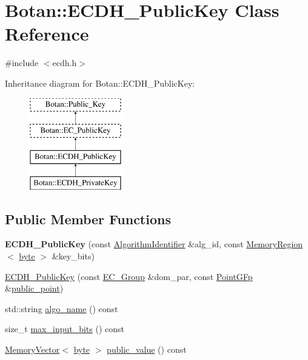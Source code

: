 \hypertarget{classBotan_1_1ECDH__PublicKey}{\section{Botan\-:\-:E\-C\-D\-H\-\_\-\-Public\-Key Class Reference}
\label{classBotan_1_1ECDH__PublicKey}
}


{\ttfamily \#include $<$ecdh.\-h$>$}

Inheritance diagram for Botan\-:\-:E\-C\-D\-H\-\_\-\-Public\-Key\-:\begin{figure}[H]
\begin{center}
\leavevmode
\includegraphics[height=4.000000cm]{classBotan_1_1ECDH__PublicKey}
\end{center}
\end{figure}
\subsection*{Public Member Functions}
\begin{DoxyCompactItemize}
\item 
\hypertarget{classBotan_1_1ECDH__PublicKey_abd3b5cafdcd7b0b8b1e7cae2e6568f00}{{\bfseries E\-C\-D\-H\-\_\-\-Public\-Key} (const \hyperlink{classBotan_1_1AlgorithmIdentifier}{Algorithm\-Identifier} \&alg\-\_\-id, const \hyperlink{classBotan_1_1MemoryRegion}{Memory\-Region}$<$ \hyperlink{namespaceBotan_a7d793989d801281df48c6b19616b8b84}{byte} $>$ \&key\-\_\-bits)}\label{classBotan_1_1ECDH__PublicKey_abd3b5cafdcd7b0b8b1e7cae2e6568f00}

\item 
\hyperlink{classBotan_1_1ECDH__PublicKey_a281af12551e9667105f14041c74142f6}{E\-C\-D\-H\-\_\-\-Public\-Key} (const \hyperlink{classBotan_1_1EC__Group}{E\-C\-\_\-\-Group} \&dom\-\_\-par, const \hyperlink{classBotan_1_1PointGFp}{Point\-G\-Fp} \&\hyperlink{classBotan_1_1EC__PublicKey_aaa811accdc280b77c1904bbbd819a1f7}{public\-\_\-point})
\item 
std\-::string \hyperlink{classBotan_1_1ECDH__PublicKey_a82eb094aea9609a05ab7e0fbf09857c2}{algo\-\_\-name} () const 
\item 
size\-\_\-t \hyperlink{classBotan_1_1ECDH__PublicKey_ae42cb4db3709691b0278252032aead80}{max\-\_\-input\-\_\-bits} () const 
\item 
\hyperlink{classBotan_1_1MemoryVector}{Memory\-Vector}$<$ \hyperlink{namespaceBotan_a7d793989d801281df48c6b19616b8b84}{byte} $>$ \hyperlink{classBotan_1_1ECDH__PublicKey_a191a3b2e67eeb1df18f82afa4dffdb12}{public\-\_\-value} () const 
\end{DoxyCompactItemize}
